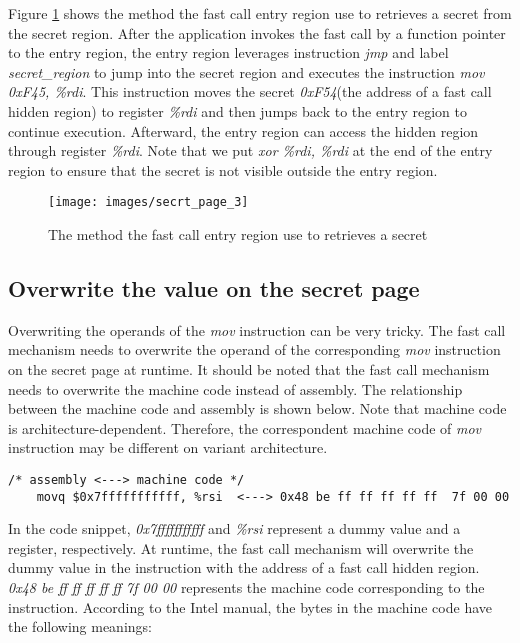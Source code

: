   Figure \ref{fig:secrt_page_3}  shows the method the fast call entry region use to retrieves a 
  secret from the secret region. After the application invokes the 
  fast call by a function pointer to the entry region, the entry region 
  leverages instruction \emph{jmp} and label \emph{secret\_region} to jump into the 
  secret region and executes the instruction \emph{mov 0xF45, \%rdi}. This 
  instruction moves the secret \emph{0xF54}(the address of a fast call hidden region) 
  to register \emph{\%rdi} and then jumps back to the entry region to continue execution. 
  Afterward, the entry region can access the hidden region through register \emph{\%rdi}.
  Note that we put  \emph{xor \%rdi, \%rdi} at the end of the entry region to ensure that the secret is not visible outside the entry region. 

  \begin{figure}[H]
    \centering
    \texttt{[image: images/secrt\_page\_3]}
    \caption[The method the fast call entry region use to retrieves a secret]{The method the fast call entry region use to retrieves a secret}
     \label{fig:secrt_page_3}
  \end{figure}

  \subsection{Overwrite the value on the secret page}

  Overwriting the operands of the \emph{mov} instruction can be very tricky. 
  The fast call mechanism needs to overwrite the operand of the corresponding 
  \emph{mov} instruction on the secret page at runtime. It should be noted that 
  the fast call mechanism needs to overwrite the machine code instead of 
  assembly. The relationship between the machine code and assembly is 
  shown below. Note that machine code is architecture-dependent. Therefore, the correspondent 
  machine code of \emph{mov} instruction may be different on variant architecture.
   

  \begin{lstlisting}[style=CStyle]
    /* assembly <---> machine code */
    movq $0x7fffffffffff, %rsi  <---> 0x48 be ff ff ff ff ff  7f 00 00
  \end{lstlisting}

  In the code snippet, \emph{0x7fffffffffff} and \emph{\%rsi} represent a dummy 
  value and a register, respectively. At runtime, the fast call mechanism 
  will overwrite the dummy value in the instruction with the address of a 
  fast call hidden region. \emph{0x48 be ff ff ff ff ff  7f 00 00} represents the 
  machine code corresponding to the instruction. According to the Intel manual, 
  the bytes in the machine code have the following meanings\cite{14}:
  
